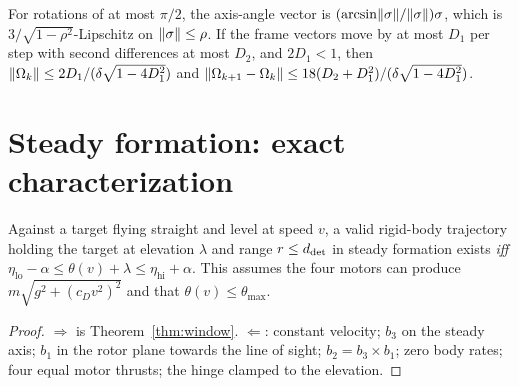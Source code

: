\begin{theorem}
\label{thm:frame-rate}
\leanok
{}
For rotations of at most $\pi/2$, the axis-angle vector is
$(\arcsin\lVert \sigma \rVert/\lVert \sigma \rVert)\sigma$, which is $3/\sqrt{1-\rho^2}$-Lipschitz on
$\lVert \sigma \rVert\le\rho$. If the frame vectors move by at most $D_1$ per step with second
differences at most $D_2$, and $2D_1<1$, then
$\lVert \Omega_k \rVert\le2D_1/(\delta\sqrt{1-4D_1^2})$ and
$\lVert \Omega_{k+1}-\Omega_k \rVert\le18(D_2+D_1^2)/(\delta\sqrt{1-4D_1^2})$.
\end{theorem}

\section{Steady formation: exact characterization}

\begin{theorem}
\label{thm:steady-formation}
\leanok
{}
Against a target flying straight and level at speed $v$, a valid rigid-body
trajectory holding the target at elevation $\lambda$ and range $r\le d_{\mathrm{det}}$ in
steady formation exists \emph{iff}
$\eta_{\mathrm{lo}}-\alpha\le\theta(v)+\lambda\le\eta_{\mathrm{hi}}+\alpha$. This
assumes the four motors can produce $m\sqrt{g^2+(c_Dv^2)^2}$ and that
$\theta(v)\le\theta_{\max}$.
\end{theorem}

\begin{proof}
\leanok
$\Rightarrow$ is Theorem~\ref{thm:window}. $\Leftarrow$: constant velocity; $b_3$
on the steady axis; $b_1$ in the rotor plane towards the line of sight;
$b_2=b_3\times b_1$; zero body rates; four equal motor thrusts; the hinge clamped to
the elevation.
\end{proof}
